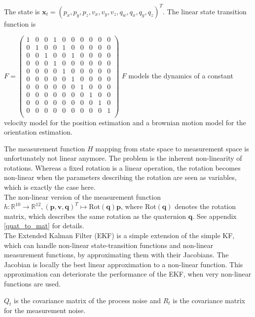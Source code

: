 \documentclass{article}
\begin{document}
The state is $\mathbf{x}_t = (p_x, p_y, p_z, v_x, v_y, v_z, q_w, q_x, q_y, q_z)^T$.
The linear state transition function is 

$F =
\begin{pmatrix}
1 & 0 & 0 & 1 & 0 & 0 & 0 & 0 & 0 & 0 \\
0 & 1 & 0 & 0 & 1 & 0 & 0 & 0 & 0 & 0 \\
0 & 0 & 1 & 0 & 0 & 1 & 0 & 0 & 0 & 0 \\
0 & 0 & 0 & 1 & 0 & 0 & 0 & 0 & 0 & 0 \\
0 & 0 & 0 & 0 & 1 & 0 & 0 & 0 & 0 & 0 \\
0 & 0 & 0 & 0 & 0 & 1 & 0 & 0 & 0 & 0 \\
0 & 0 & 0 & 0 & 0 & 0 & 1 & 0 & 0 & 0 \\
0 & 0 & 0 & 0 & 0 & 0 & 0 & 1 & 0 & 0 \\
0 & 0 & 0 & 0 & 0 & 0 & 0 & 0 & 1 & 0 \\
0 & 0 & 0 & 0 & 0 & 0 & 0 & 0 & 0 & 1 \\
\end{pmatrix}
$
$F$ models the dynamics of a constant velocity model for the position estimation and a brownian motion model for the orientation estimation. 

The measurement function $H$ mapping from state space to measurement space is unfortunately not linear anymore. The problem is the inherent non-linearity of rotations. Whereas a fixed rotation is a linear operation, the rotation becomes non-linear when the parameters describing the rotation are seen as variables, which is exactly the case here. \\
The non-linear version of the measurement function $h: \mathbb{R}^{10} \rightarrow \mathbb{R}^{12}, (\mathbf{p}, \mathbf{v}, \mathbf{q})^T \mapsto \text{Rot}(\mathbf{q})\mathbf{p}$, where $\text{Rot}(\mathbf{q})$ denotes the rotation matrix, which describes the same rotation as the quaternion $\mathbf{q}$. See appendix \ref{quat_to_mat} for details. \\
The Extended Kalman Filter (EKF) is a simple extension of the simple KF, which can handle non-linear state-transition functions and non-linear measurement functions, by approximating them with their Jacobians. The Jacobian is locally the best linear approximation to a non-linear function. This approximation can deteriorate the performance of the EKF, when very non-linear functions are used. %

$Q_t$ is the covariance matrix of the process noise and $R_t$ is the covariance matrix for the measurement noise.
\end{document}
